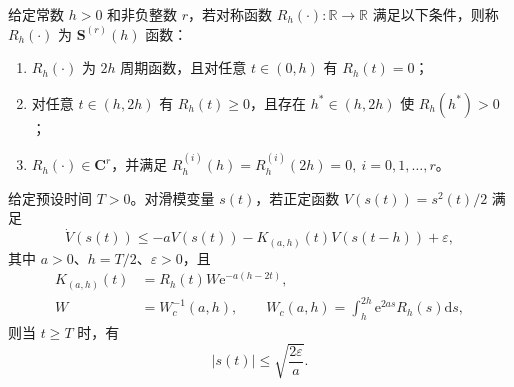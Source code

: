 \begin{definition}
给定常数 $h>0$ 和非负整数 $r$，若对称函数 $R_h(\cdot):\mathbb R\to\mathbb R$ 满足以下条件，则称 $R_h(\cdot)$ 为 $\boldsymbol S^{(r)}(h)$ 函数：
\begin{enumerate}[wide]
  \item $R_h(\cdot)$ 为 $2h$ 周期函数，且对任意 $t\in(0,h)$ 有 $R_h(t)=0$；
  \item 对任意 $t\in(h,2h)$ 有 $R_h(t)\geq0$，且存在 $h^\ast\in(h,2h)$ 使 $R_h(h^\ast)>0$；
  \item $R_h(\cdot)\in \boldsymbol C^r$，并满足 $R_h^{(i)}(h)=R_h^{(i)}(2h)=0,\ i=0,1,\ldots,r$。
\end{enumerate}
\end{definition}

\begin{lemma}
\label{lem:spdf_linear}
给定预设时间 $T>0$。对滑模变量 $s(t)$，若正定函数 $V(s(t))=s^2(t)/2$ 满足
\begin{equation}
\dot V(s(t))\leq -aV(s(t))-K_{(a,h)}(t)V(s(t-h))+\varepsilon,
\label{eq:spdf_lemma1_cond}
\end{equation}
其中 $a>0$、$h=T/2$、$\varepsilon>0$，且
\begin{equation}
\begin{aligned}
K_{(a,h)}(t)&=R_h(t)W\mathrm e^{-a(h-2t)},\\
W&=W_c^{-1}(a,h),\qquad
W_c(a,h)=\int_h^{2h}\mathrm e^{2as}R_h(s)\mathrm ds,
\end{aligned}
\label{eq:spdf_periodic_gain}
\end{equation}
则当 $t\geq T$ 时，有
\begin{equation}
|s(t)|\leq \sqrt{\frac{2\varepsilon}{a}}.
\label{eq:spdf_lemma1_bound}
\end{equation}
\end{lemma}

